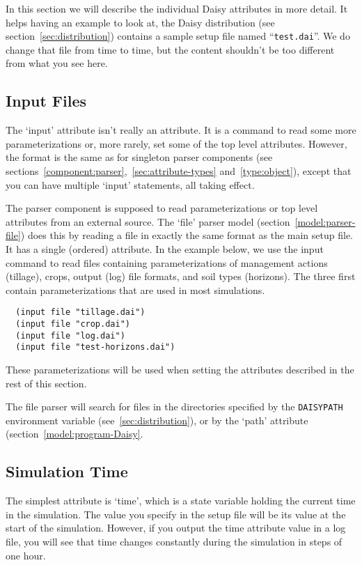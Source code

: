 In this section we will describe the individual Daisy attributes in
more detail.  It helps having an example to look at, the Daisy
distribution (see section~\ref{sec:distribution}) contains a sample
setup file named ``\texttt{test.dai}''.  We do change that file from
time to time, but the content shouldn't be too different from what you
see here.

\subsection{Input Files}
\label{sec:daisy-input}

The `input' attribute isn't really an attribute.  It is a command to
read some more parameterizations or, more rarely, set some of the top
level attributes.  However, the format is the same as for singleton
parser components (see
sections~\ref{component:parser},~\ref{sec:attribute-types}
and~\ref{type:object}), except that you can have multiple `input'
statements, all taking effect.

The parser component is supposed to read parameterizations or top
level attributes from an external source.  The `file' parser model
(section~\ref{model:parser-file}) does this by reading a file in
exactly the same format as the main setup file.  It has a single
(ordered) attribute.  In the example below, we use the input command
to read files containing parameterizations of management actions
(tillage), crops, output (log) file formats, and soil types
(horizons).  The three first contain parameterizations that are used
in most simulations.

\begin{verbatim}
  (input file "tillage.dai")
  (input file "crop.dai")
  (input file "log.dai")
  (input file "test-horizons.dai")
\end{verbatim}

These parameterizations will be used when setting the attributes
described in the rest of this section.

The file parser will search for files in the directories specified by
the \texttt{DAISYPATH} environment variable
(see~\ref{sec:distribution}), or by the `path' attribute
(section~\ref{model:program-Daisy}. 

\subsection{Simulation Time}

The simplest attribute is `time', which is a state variable holding
the current time in the simulation.  The value you specify in the
setup file will be its value at the start of the simulation.
However, if you output the time attribute value in a log file, you will
see that time changes constantly during the simulation in steps of one
hour.

